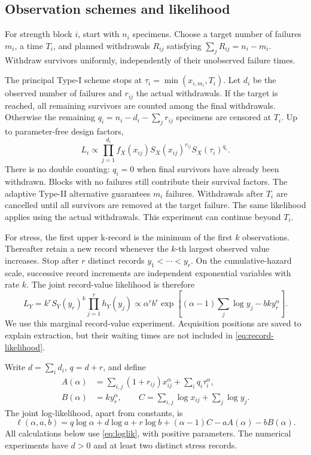 \documentclass[a4paper,11pt]{article}
\begin{document}


\subsection{Observation schemes and likelihood}\label{sec:sampling}
For strength block $i$, start with $n_i$ specimens. Choose a target number of failures $m_i$, a time $T_i$, and planned withdrawals $R_{ij}$ satisfying $\sum_jR_{ij}=n_i-m_i$. Withdraw survivors uniformly, independently of their unobserved failure times.

The principal Type-I scheme stops at $\tau_i=\min(x_{i,m_i},T_i)$. Let $d_i$ be the observed number of failures and $r_{ij}$ the actual withdrawals. If the target is reached, all remaining survivors are counted among the final withdrawals. Otherwise the remaining $q_i=n_i-d_i-\sum_jr_{ij}$ specimens are censored at $T_i$. Up to parameter-free design factors,
\begin{equation}
L_i\propto\prod_{j=1}^{d_i}f_X(x_{ij})S_X(x_{ij})^{r_{ij}}S_X(\tau_i)^{q_i}.\label{eq:block-likelihood}
\end{equation}
There is no double counting: $q_i=0$ when final survivors have already been withdrawn. Blocks with no failures still contribute their survival factors. The adaptive Type-II alternative guarantees $m_i$ failures. Withdrawals after $T_i$ are cancelled until all survivors are removed at the target failure. The same likelihood applies using the actual withdrawals. This experiment can continue beyond $T_i$.

For stress, the first upper k-record is the minimum of the first $k$ observations. Thereafter retain a new record whenever the $k$-th largest observed value increases. Stop after $r$ distinct records $y_1<\cdots<y_r$. On the cumulative-hazard scale, successive record increments are independent exponential variables with rate $k$. The joint record-value likelihood is therefore
\begin{equation}
L_Y=k^r S_Y(y_r)^k\prod_{j=1}^r h_Y(y_j)
\propto\alpha^r b^r\exp\left[(\alpha-1)\sum_j\log y_j-bky_r^\alpha\right].\label{eq:record-likelihood}
\end{equation}
We use this marginal record-value experiment. Acquisition positions are saved to explain extraction, but their waiting times are not included in \eqref{eq:record-likelihood}.

Write $d=\sum_i d_i$, $q=d+r$, and define
\begin{align}
A(\alpha)&=\sum_{i,j}(1+r_{ij})x_{ij}^\alpha+\sum_iq_i\tau_i^\alpha,\label{eq:exposure-a}\\
B(\alpha)&=ky_r^\alpha,\qquad C=\sum_{i,j}\log x_{ij}+\sum_j\log y_j.\label{eq:exposure-b}
\end{align}
The joint log-likelihood, apart from constants, is
\begin{equation}
\ell(\alpha,a,b)=q\log\alpha+d\log a+r\log b+(\alpha-1)C-aA(\alpha)-bB(\alpha).\label{eq:loglik}
\end{equation}
All calculations below use \eqref{eq:loglik}, with positive parameters. The numerical experiments have $d>0$ and at least two distinct stress records.
\end{document}

